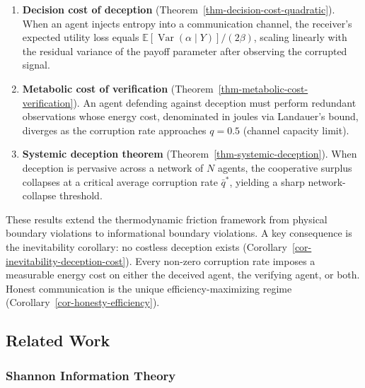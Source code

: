 \documentclass[11pt]{article}
\theoremstyle{plain}
\theoremstyle{definition}
\theoremstyle{remark}
\let\origsubsection\subsection
\renewcommand{\subsection}{\needspace{7\baselineskip}\origsubsection}
\let\origsubsubsection\subsubsection
\renewcommand{\subsubsection}{\needspace{4\baselineskip}\origsubsubsection}
\begin{document}
\begin{enumerate}
\def\labelenumi{\arabic{enumi}.}
\item
  \textbf{Decision cost of deception}
  (Theorem~\ref{thm-decision-cost-quadratic}). When an agent injects
  entropy into a communication channel, the receiver's expected utility
  loss equals
  \(\mathbb{E}[\operatorname{Var}(\alpha \mid Y)] / (2\beta)\), scaling
  linearly with the residual variance of the payoff parameter after
  observing the corrupted signal.
\item
  \textbf{Metabolic cost of verification}
  (Theorem~\ref{thm-metabolic-cost-verification}). An agent defending
  against deception must perform redundant observations whose energy
  cost, denominated in joules via Landauer's bound, diverges as the
  corruption rate approaches \(q = 0.5\) (channel capacity limit).
\item
  \textbf{Systemic deception theorem}
  (Theorem~\ref{thm-systemic-deception}). When deception is pervasive
  across a network of \(N\) agents, the cooperative surplus collapses at
  a critical average corruption rate \(\bar{q}^*\), yielding a sharp
  network-collapse threshold.
\end{enumerate}

These results extend the thermodynamic friction framework from physical
boundary violations to informational boundary violations. A key
consequence is the inevitability corollary: no costless deception exists
(Corollary~\ref{cor-inevitability-deception-cost}). Every non-zero
corruption rate imposes a measurable energy cost on either the deceived
agent, the verifying agent, or both. Honest communication is the unique
efficiency-maximizing regime (Corollary~\ref{cor-honesty-efficiency}).

\subsection{Related Work}\label{related-work}

\subsubsection{Shannon Information
Theory}\label{shannon-information-theory}
\end{document}
